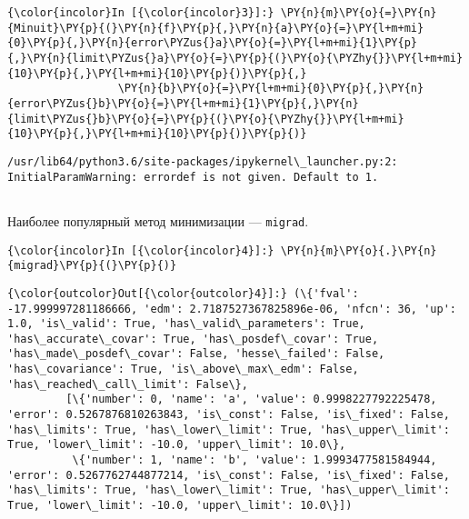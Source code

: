     \begin{Verbatim}[commandchars=\\\{\}]
{\color{incolor}In [{\color{incolor}3}]:} \PY{n}{m}\PY{o}{=}\PY{n}{Minuit}\PY{p}{(}\PY{n}{f}\PY{p}{,}\PY{n}{a}\PY{o}{=}\PY{l+m+mi}{0}\PY{p}{,}\PY{n}{error\PYZus{}a}\PY{o}{=}\PY{l+m+mi}{1}\PY{p}{,}\PY{n}{limit\PYZus{}a}\PY{o}{=}\PY{p}{(}\PY{o}{\PYZhy{}}\PY{l+m+mi}{10}\PY{p}{,}\PY{l+m+mi}{10}\PY{p}{)}\PY{p}{,}
                 \PY{n}{b}\PY{o}{=}\PY{l+m+mi}{0}\PY{p}{,}\PY{n}{error\PYZus{}b}\PY{o}{=}\PY{l+m+mi}{1}\PY{p}{,}\PY{n}{limit\PYZus{}b}\PY{o}{=}\PY{p}{(}\PY{o}{\PYZhy{}}\PY{l+m+mi}{10}\PY{p}{,}\PY{l+m+mi}{10}\PY{p}{)}\PY{p}{)}
\end{Verbatim}


    \begin{Verbatim}[commandchars=\\\{\}]
/usr/lib64/python3.6/site-packages/ipykernel\_launcher.py:2: InitialParamWarning: errordef is not given. Default to 1.
  

    \end{Verbatim}

    Наиболее популярный метод минимизации --- \texttt{migrad}.

    \begin{Verbatim}[commandchars=\\\{\}]
{\color{incolor}In [{\color{incolor}4}]:} \PY{n}{m}\PY{o}{.}\PY{n}{migrad}\PY{p}{(}\PY{p}{)}
\end{Verbatim}


    
    
    
    
    
    
    
    
\begin{Verbatim}[commandchars=\\\{\}]
{\color{outcolor}Out[{\color{outcolor}4}]:} (\{'fval': -17.999997281186666, 'edm': 2.7187527367825896e-06, 'nfcn': 36, 'up': 1.0, 'is\_valid': True, 'has\_valid\_parameters': True, 'has\_accurate\_covar': True, 'has\_posdef\_covar': True, 'has\_made\_posdef\_covar': False, 'hesse\_failed': False, 'has\_covariance': True, 'is\_above\_max\_edm': False, 'has\_reached\_call\_limit': False\},
         [\{'number': 0, 'name': 'a', 'value': 0.9998227792225478, 'error': 0.5267876810263843, 'is\_const': False, 'is\_fixed': False, 'has\_limits': True, 'has\_lower\_limit': True, 'has\_upper\_limit': True, 'lower\_limit': -10.0, 'upper\_limit': 10.0\},
          \{'number': 1, 'name': 'b', 'value': 1.9993477581584944, 'error': 0.5267762744877214, 'is\_const': False, 'is\_fixed': False, 'has\_limits': True, 'has\_lower\_limit': True, 'has\_upper\_limit': True, 'lower\_limit': -10.0, 'upper\_limit': 10.0\}])
\end{Verbatim}
            
